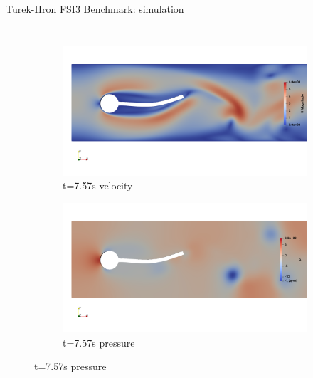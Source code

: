\documentclass[10pt,t]{beamer}
\begin{document}

\begin{frame}{Turek-Hron FSI3 Benchmark: simulation}

\begin{columns}


\begin{figure}[htb]
\centering %
\begin{subfigure}{0.5\textwidth}
  \includegraphics[width=\linewidth, trim=0 120 0 120, clip]{images/FSI3/fsi3_v1.png}
  \caption{t=7.57s velocity}
  \label{fig:fsi3_v1}
\end{subfigure}\hfil %
\begin{subfigure}{0.5\textwidth}
  \includegraphics[width=\linewidth, trim=0 120 0 120, clip]{images/FSI3/fsi3_p1.png}
  \caption{t=7.57s pressure}
  \label{fig:fsi3_p1}
\end{subfigure}\hfil %

\medskip


\end{figure}
\end{columns}
\end{frame}
\end{document}
